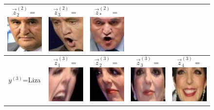 \documentclass[12pt]{article}
\begin{document}
\begin{figure}
\begin{tabular}{|c|ccc|c|}
  $\vec{z}_2^{(2)} = $\includegraphics[scale = 0.2]{face_photos/Jean-Pierre_Raffarin_0002.png} &  
  $\vec{z}_3^{(2)} = $\includegraphics[scale = 0.2]{face_photos/Jean-Pierre_Raffarin_0003.png} &  
  $\vec{z}_*^{(2)} = $\includegraphics[scale = 0.2]{face_photos/Jean-Pierre_Raffarin_0004.png} \\ \hline
$y^{(3)}$=Liza & 
  $\vec{z}_1^{(3)} = $\includegraphics[scale = 0.2]{face_photos/Liza_Minnelli_0001.png} &  
  $\vec{z}_2^{(3)} = $\includegraphics[scale = 0.2]{face_photos/Liza_Minnelli_0002.png} &  
  $\vec{z}_3^{(3)} = $\includegraphics[scale = 0.2]{face_photos/Liza_Minnelli_0003.png} &  
  $\vec{z}_4^{(3)} = $\includegraphics[scale = 0.2]{face_photos/Liza_Minnelli_0004.png} \\ \hline

\end{tabular}
\end{figure}
\end{document}
